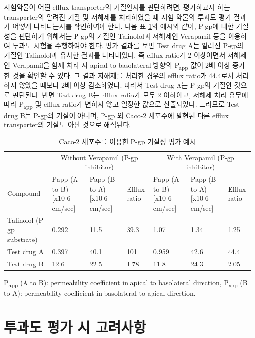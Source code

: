 \documentclass[
  11pt,
  krantz2, a4paper, twoside]{krantz}
\begin{document}
시험약물이 어떤 efflux transporter의 기질인지를 판단하려면, 평가하고자 하는 transporter의 알려진 기질 및 저해제를 처리하였을 때 시험 약물의 투과도 평가 결과가 어떻게 나타나는지를 확인하여야 한다. 다음 표 \ref{tab:caco-2-pgp}의 예시와 같이, P-gp에 대한 기질성을 판단하기 위해서는 P-gp의 기질인 Talinolol과 저해제인 Verapamil 등을 이용하여 투과도 시험을 수행하여야 한다. 평가 결과를 보면 Test drug A는 알려진 P-gp의 기질인 Talinolol과 유사한 결과를 나타내었다. 즉 efflux ratio가 2 이상이면서 저해제인 Verapamil을 함께 처리 시 apical to basolateral 방향의 P\textsubscript{app} 값이 2배 이상 증가한 것을 확인할 수 있다. 그 결과 저해제를 처리한 경우의 efflux ratio가 44.4로서 처리하지 않았을 때보다 2배 이상 감소하였다. 따라서 Test drug A는 P-gp의 기질인 것으로 판단된다. 반면 Test drug B는 efflux ratio가 모두 2 이하이고, 저해제 처리 유무에 따라 P\textsubscript{app} 및 efflux ratio가 변하지 않고 일정한 값으로 산출되었다. 그러므로 Test drug B는 P-gp의 기질이 아니며, P-gp 외 Caco-2 세포주에 발현된 다른 efflux transporter의 기질도 아닌 것으로 해석된다.



\begin{table}

\caption{\label{tab:caco-2-pgp}Caco-2 세포주를 이용한 P-gp 기질성 평가 예시}
\centering
\begin{tabular}[t]{lllllll}
\toprule
\multicolumn{1}{c}{ } & \multicolumn{3}{c}{Without Verapamil (P-gp inhibitor)} & \multicolumn{3}{c}{With Verapamil (P-gp inhibitor)} \\
\cmidrule(l{3pt}r{3pt}){2-4} \cmidrule(l{3pt}r{3pt}){5-7}
Compound & Papp (A to B) [x10-6 cm/sec] & Papp (B to A) [x10-6 cm/sec] & Efflux ratio & Papp (A to B) [x10-6 cm/sec]  & Papp (B to A) [x10-6 cm/sec]  & Efflux ratio \\
\midrule
Talinolol (P-gp substrate) & 0.292 & 11.5 & 39.3 & 1.07 & 1.34 & 1.25\\
Test drug A & 0.397 & 40.1 & 101 & 0.959 & 42.6 & 44.4\\
Test drug B & 12.6 & 22.5 & 1.78 & 11.8 & 24.3 & 2.05\\
\bottomrule
\end{tabular}
\end{table}

P\textsubscript{app} (A to B): permeability coefficient in apical to basolateral direction, P\textsubscript{app} (B to A): permeability coefficient in basolateral to apical direction.

\hypertarget{uxd22cuxacfcuxb3c4-uxd3c9uxac00-uxc2dc-uxace0uxb824uxc0acuxd56d}{%
\section{투과도 평가 시 고려사항}\label{uxd22cuxacfcuxb3c4-uxd3c9uxac00-uxc2dc-uxace0uxb824uxc0acuxd56d}}
\end{document}
